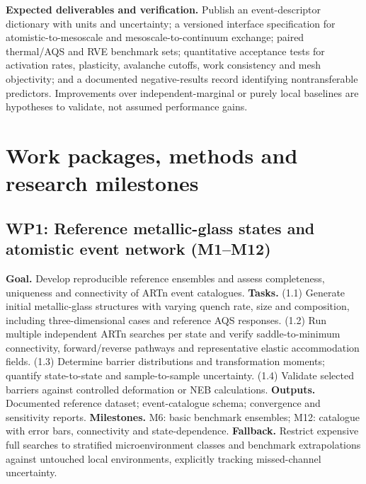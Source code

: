 \documentclass[11pt,a4paper]{article}
\begin{document}
\textbf{Expected deliverables and verification.} Publish an event-descriptor dictionary with units and uncertainty; a versioned interface specification for atomistic-to-mesoscale and mesoscale-to-continuum exchange; paired thermal/AQS and RVE benchmark sets; quantitative acceptance tests for activation rates, plasticity, avalanche cutoffs, work consistency and mesh objectivity; and a documented negative-results record identifying nontransferable predictors. Improvements over independent-marginal or purely local baselines are hypotheses to validate, not assumed performance gains.
\FloatBarrier

\section{Work packages, methods and research milestones}
\subsection{WP1: Reference metallic-glass states and atomistic event network (M1--M12)}
\textbf{Goal.} Develop reproducible reference ensembles and assess completeness, uniqueness and connectivity of ARTn event catalogues. \textbf{Tasks.} (1.1) Generate initial metallic-glass structures with varying quench rate, size and composition, including three-dimensional cases and reference AQS responses. (1.2) Run multiple independent ARTn searches per state and verify saddle-to-minimum connectivity, forward/reverse pathways and representative elastic accommodation fields. (1.3) Determine barrier distributions and transformation moments; quantify state-to-state and sample-to-sample uncertainty. (1.4) Validate selected barriers against controlled deformation or NEB calculations. \textbf{Outputs.} Documented reference dataset; event-catalogue schema; convergence and sensitivity reports. \textbf{Milestones.} M6: basic benchmark ensembles; M12: catalogue with error bars, connectivity and state-dependence. \textbf{Fallback.} Restrict expensive full searches to stratified microenvironment classes and benchmark extrapolations against untouched local environments, explicitly tracking missed-channel uncertainty.
\end{document}
